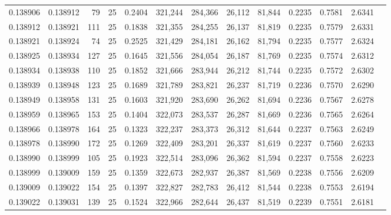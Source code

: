 \begin{tabular}{rrrrrrrrrrrrr}
0.138906 & 0.138912 &    79 &  25 &                                     0.2404 & 321,244 & 284,366 &  26,112 &  81,844 & 0.2235 & 0.7581 & 2.6341 \\
0.138912 & 0.138921 &   111 &  25 &                                     0.1838 & 321,355 & 284,255 &  26,137 &  81,819 & 0.2235 & 0.7579 & 2.6331 \\
0.138921 & 0.138924 &    74 &  25 &                                     0.2525 & 321,429 & 284,181 &  26,162 &  81,794 & 0.2235 & 0.7577 & 2.6324 \\
0.138925 & 0.138934 &   127 &  25 &                                     0.1645 & 321,556 & 284,054 &  26,187 &  81,769 & 0.2235 & 0.7574 & 2.6312 \\
0.138934 & 0.138938 &   110 &  25 &                                     0.1852 & 321,666 & 283,944 &  26,212 &  81,744 & 0.2235 & 0.7572 & 2.6302 \\
0.138939 & 0.138948 &   123 &  25 &                                     0.1689 & 321,789 & 283,821 &  26,237 &  81,719 & 0.2236 & 0.7570 & 2.6290 \\
0.138949 & 0.138958 &   131 &  25 &                                     0.1603 & 321,920 & 283,690 &  26,262 &  81,694 & 0.2236 & 0.7567 & 2.6278 \\
0.138959 & 0.138965 &   153 &  25 &                                     0.1404 & 322,073 & 283,537 &  26,287 &  81,669 & 0.2236 & 0.7565 & 2.6264 \\
0.138966 & 0.138978 &   164 &  25 &                                     0.1323 & 322,237 & 283,373 &  26,312 &  81,644 & 0.2237 & 0.7563 & 2.6249 \\
0.138978 & 0.138990 &   172 &  25 &                                     0.1269 & 322,409 & 283,201 &  26,337 &  81,619 & 0.2237 & 0.7560 & 2.6233 \\
0.138990 & 0.138999 &   105 &  25 &                                     0.1923 & 322,514 & 283,096 &  26,362 &  81,594 & 0.2237 & 0.7558 & 2.6223 \\
0.138999 & 0.139009 &   159 &  25 &                                     0.1359 & 322,673 & 282,937 &  26,387 &  81,569 & 0.2238 & 0.7556 & 2.6209 \\
0.139009 & 0.139022 &   154 &  25 &                                     0.1397 & 322,827 & 282,783 &  26,412 &  81,544 & 0.2238 & 0.7553 & 2.6194 \\
0.139022 & 0.139031 &   139 &  25 &                                     0.1524 & 322,966 & 282,644 &  26,437 &  81,519 & 0.2239 & 0.7551 & 2.6181 \\

\end{tabular}
